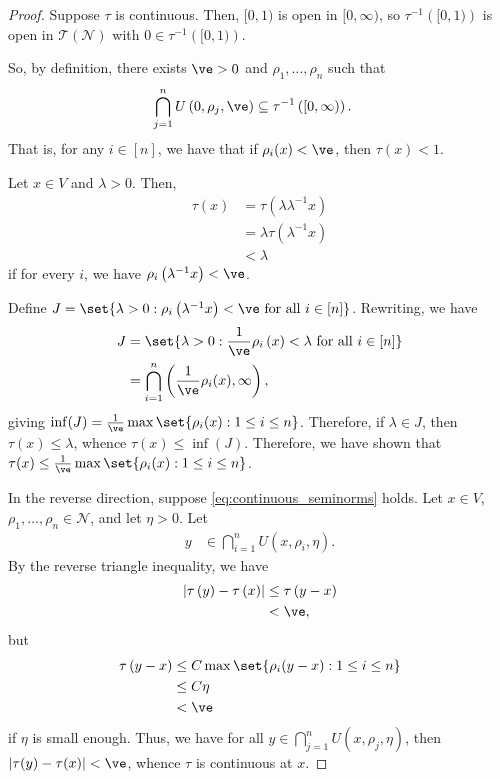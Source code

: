 \documentclass[10pt]{mypackage}
\begin{document}
\begin{proof}
  Suppose $\tau$ is continuous. Then, $[0,1)$ is open in $[0,\infty)$, so $\tau^{-1}\left( [0,1) \right)$ is open in $ \mathcal{T}\left( \mathcal{N} \right) $ with $0\in \tau^{-1}\left( [0,1) \right)$.

  So, by definition, there exists $\ve > 0$ and $\rho_1,\dots,\rho_n$ such that
  \begin{align*}
    \bigcap_{j=1}^{n} U\left( 0,\rho_j,\ve \right) &\subseteq \tau^{-1}\left( [0,\infty) \right).
  \end{align*}
  That is, for any $i\in [n]$, we have that if $\rho_i(x) < \ve$, then $\tau(x) < 1$.

  Let $x\in V$ and $\lambda > 0$. Then,
  \begin{align*}
    \tau(x) &= \tau\left( \lambda \lambda^{-1}x \right)\\
            &= \lambda \tau\left( \lambda^{-1}x \right)\\
            &< \lambda
  \end{align*}
  if for every $i$, we have $\rho_i\left( \lambda^{-1}x \right) < \ve$. 

  Define $J = \set{\lambda > 0 : \rho_i\left(\lambda^{-1}x\right) < \ve\text{ for all }i\in [n]}$. Rewriting, we have
  \begin{align*}
    J &= \set{\lambda > 0 : \frac{1}{\ve}\rho_i\left( x \right) < \lambda\text{ for all }i\in [n]}\\
      &= \bigcap_{i=1}^{n} \left( \frac{1}{\ve}\rho_i(x),\infty \right),
  \end{align*}
  giving $\inf(J) = \frac{1}{\ve}\max\set{\rho_i(x) : 1\leq i \leq n}$. Therefore, if $\lambda\in J$, then $\tau(x) \leq \lambda$, whence $\tau(x) \leq \inf(J)$. Therefore, we have shown that $\tau(x) \leq \frac{1}{\ve}\max\set{\rho_i(x) : 1\leq i \leq n}$.

  In the reverse direction, suppose \eqref{eq:continuous_seminorms} holds. Let $x\in V$, $\rho_1,\dots,\rho_n\in \mathcal{N}$, and let $\eta > 0$. Let
  \begin{align*}
    y &\in \bigcap_{i=1}^{n} U\left( x,\rho_i,\eta \right).
  \end{align*}
  By the reverse triangle inequality, we have
  \begin{align*}
    \left\vert \tau\left( y \right) - \tau\left( x \right) \right\vert &\leq \tau\left( y-x \right)\\
                                                                       &< \ve,
  \end{align*}
  but
  \begin{align*}
    \tau\left( y-x \right) &\leq C \max\set{\rho_i(y-x) : 1\leq i \leq n}\\
                           &\leq C \eta\\
                           &< \ve
  \end{align*}
  if $\eta$ is small enough. Thus, we have for all $y\in \bigcap_{j=1}^{n}U\left( x,\rho_j,\eta \right)$, then $\left\vert \tau(y)-\tau(x) \right\vert < \ve$, whence $\tau$ is continuous at $x$.
\end{proof}
\end{document}
